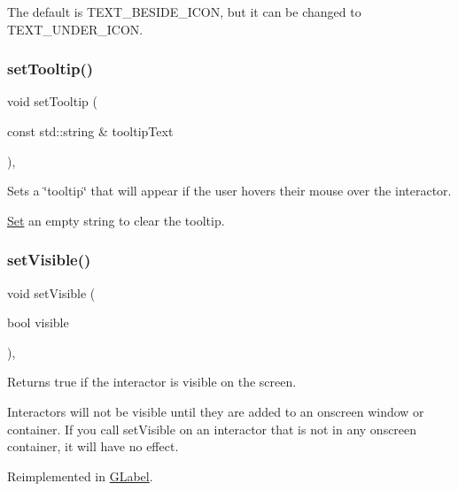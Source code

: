 The default is T\+E\+X\+T\+\_\+\+B\+E\+S\+I\+D\+E\+\_\+\+I\+C\+ON, but it can be changed to T\+E\+X\+T\+\_\+\+U\+N\+D\+E\+R\+\_\+\+I\+C\+ON. \mbox{\label{classGInteractor_a039e0e49beaecc275efce02d416acea8}} 
\subsubsection{\texorpdfstring{set\+Tooltip()}{setTooltip()}}
{\footnotesize\ttfamily void set\+Tooltip (\begin{DoxyParamCaption}\item[{const std\+::string \&}]{tooltip\+Text }\end{DoxyParamCaption})\hspace{0.3cm}{\ttfamily [virtual]}, {\ttfamily [inherited]}}



Sets a \char`\"{}tooltip\char`\"{} that will appear if the user hovers their mouse over the interactor. 

\mbox{\hyperlink{classSet}{Set}} an empty string to clear the tooltip. \mbox{\label{classGInteractor_a18e44e30b31525a243960ca3928125aa}} 
\subsubsection{\texorpdfstring{set\+Visible()}{setVisible()}}
{\footnotesize\ttfamily void set\+Visible (\begin{DoxyParamCaption}\item[{bool}]{visible }\end{DoxyParamCaption})\hspace{0.3cm}{\ttfamily [virtual]}, {\ttfamily [inherited]}}



Returns true if the interactor is visible on the screen. 

Interactors will not be visible until they are added to an onscreen window or container. If you call set\+Visible on an interactor that is not in any onscreen container, it will have no effect. 

Reimplemented in \mbox{\hyperlink{classGLabel_a95c2a1221e6c59e9de544054963b4b18}{G\+Label}}.

